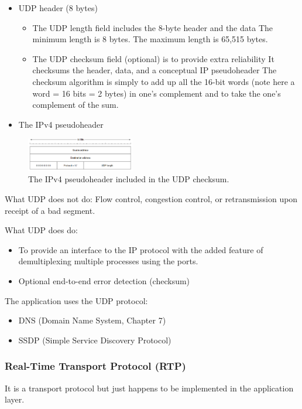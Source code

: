 \begin{itemize}
    \item UDP header (8 bytes)
    \begin{itemize}\small
        \item The UDP length field includes the 8-byte header and the data
        \subitem The minimum length is 8 bytes. The maximum length is 65,515 bytes. 
        \item The UDP checksum field (optional) is to provide extra reliability
        \subitem It checksums the header, data, and a conceptual IP pseudoheader
        \subitem The checksum algorithm is simply to add up all the 16-bit words (note here a word = 16 bits = 2 bytes) in one's complement and to take the one's complement of the sum.
    \end{itemize}
    \item The IPv4 pseudoheader
\end{itemize}
\begin{figure}[!htb]
    \centering
    \includegraphics[width=0.42\textwidth]{pic/CN6/The IPv4 pseudoheader included in the UDP checksum.}
    \caption{The IPv4 pseudoheader included in the UDP checksum.}
\end{figure}

What UDP does not do: Flow control, congestion control, or retransmission upon receipt of a bad segment. 

What UDP does do:
\begin{itemize}
    \item To provide an interface to the IP protocol with the added feature of
    demultiplexing multiple processes using the ports.
    \item Optional end-to-end error detection (checksum)
\end{itemize}

The application uses the UDP protocol: 
\begin{itemize}
    \item DNS (Domain Name System, Chapter 7)
    \item SSDP (Simple Service Discovery Protocol)
\end{itemize}

\subsubsection{Real-Time Transport Protocol (RTP)}
It is a transport protocol but just happens to be implemented in the application layer.

